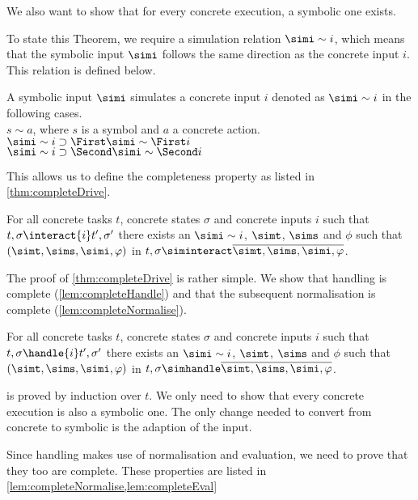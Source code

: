 We also want to show that for every concrete execution, a symbolic one exists.

To state this Theorem, we require a simulation relation $\simi\sim i$, which means that the symbolic input $\simi$ follows the same direction as the concrete input $i$.
This relation is defined below.

\begin{definition}
  A symbolic input $\simi$ simulates a concrete input $i$ denoted as $\simi\sim i$ in the following cases.\\
  $s\sim a$, where $s$ is a symbol and $a$ a concrete action.\\
  $\simi\sim i\implies \First \simi \sim \First i$\\
  $\simi\sim i\implies \Second \simi \sim \Second i$
\end{definition}

This allows us to define the completeness property as listed in \cref{thm:completeDrive}.

\begin{theorem}
  \label{thm:completeDrive}
  For all concrete tasks $t$, concrete states $\sigma$ and concrete inputs $i$ such that $t,\sigma \interact{i} t',\sigma'$
there exists an $\simi\sim i$, $\simt$, $\sims$ and $\phi$ such that $(\simt,\sims,\simi,\phi)$ in $t,\sigma\siminteract \overline{\simt,\sims,\simi,\phi}$.
\end{theorem}


The proof of \cref{thm:completeDrive} is rather simple.
We show that handling is complete (\cref{lem:completeHandle})
and that the subsequent normalisation is complete (\cref{lem:completeNormalise}).


\begin{lemma}
  \label{lem:completeHandle}
  For all concrete tasks $t$, concrete states $\sigma$ and concrete inputs $i$ such that $t,\sigma \handle{i} t',\sigma'$
  there exists an $\simi\sim i$, $\simt$, $\sims$ and $\phi$ such that $(\simt,\sims,\simi,\phi)$ in $t,\sigma\simhandle \overline{\simt,\sims,\simi,\phi}$.
\end{lemma}

 is proved by induction over $t$.
We only need to show that every concrete execution is also a symbolic one.
The only change needed to convert from concrete to symbolic is the adaption of the input.

Since handling makes use of normalisation and evaluation, we need to prove that they too are complete.
These properties are listed in \cref{lem:completeNormalise,lem:completeEval}

